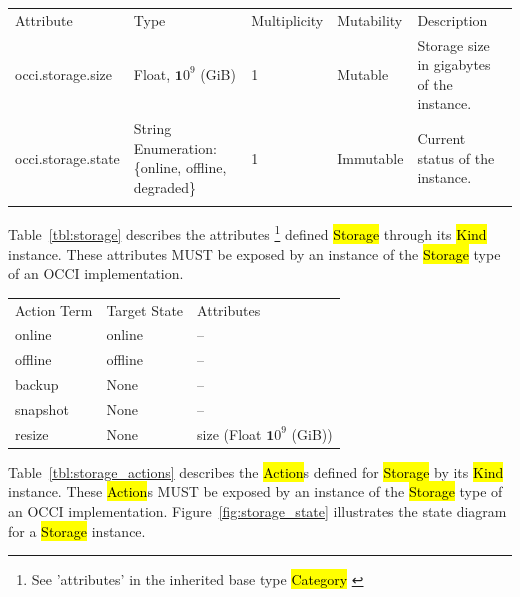 \documentclass[10pt,a4paper]{article}
\begin{document}
{
	\begin{tabular}{lp{2.5cm}p{1cm}lp{6cm}}
	\toprule
	Attribute&Type&Multi\-plicity&Mutability&Description\\
	\colrule
	\hline
	occi.storage.size & Float, ${\mathbf 10}^9$ (GiB) & 1 & Mutable 
	& Storage size in gigabytes of the 	instance.\\
	occi.storage.state & String Enumeration: \{online, offline, degraded\} & 1 & Immutable 
	& Current status of the instance.\\
	\botrule
	\end{tabular}
}
Table~\ref{tbl:storage} describes the attributes \footnote{See ’attributes’ in the inherited 
base type \hl{Category}  \cite{occi:core}} 
defined \hl{Storage} through its \hl{Kind} instance. These attributes
MUST be exposed by an instance of the \hl{Storage} type of an OCCI implementation.

{
	\begin{tabular}{lll}
	\toprule
	Action Term&Target State&Attributes\\
	\colrule
	online & online & --\\
	offline & offline & --\\
	backup & None & --\\
	snapshot & None & --\\
	resize & None & size (Float  ${\mathbf 10}^9$ (GiB))
	\end{tabular}
}

Table~\ref{tbl:storage_actions} describes the \hl{Action}s defined for
\hl{Storage} by its \hl{Kind} instance. These \hl{Action}s MUST be exposed 
by an instance of the \hl{Storage} type of an OCCI implementation. 
Figure~\ref{fig:storage_state} illustrates the state diagram for a \hl{Storage} instance.
\end{document}
